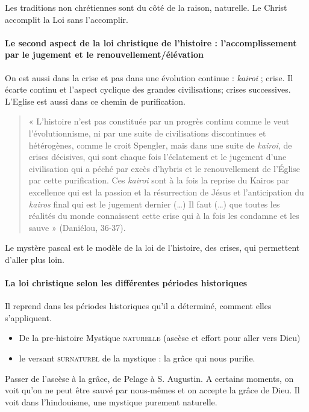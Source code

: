Les traditions non chrétiennes sont du côté de la raison, naturelle. 
Le Christ accomplit la Loi sans l'accomplir. 


\paragraph{Le second aspect de la loi christique de l’histoire : l’accomplissement par le jugement et le renouvellement/élévation}  On est aussi dans la crise et pas dans une évolution continue : \textit{kairoi} ; crise. Il écarte continu et l'aspect cyclique des grandes civilisations; crises successives. L'Eglise est aussi dans ce chemin de purification. 

\begin{quote}
    « L’histoire n’est pas constituée par un progrès continu comme le veut l’évolutionnisme, ni par une suite de civilisations discontinues et hétérogènes, comme le croit Spengler, mais dans une suite de \textit{kairoi}, de crises décisives, qui sont chaque fois l’éclatement et le jugement d’une civilisation qui a péché par excès d’hybris et le renouvellement de l’Église par cette purification. Ces \textit{kairoi} sont à la fois la reprise du Kairos par excellence qui est la passion et la résurrection de Jésus et l’anticipation du \textit{kairos} final qui est le jugement dernier (…) Il faut (…) que toutes les réalités du monde connaissent cette crise qui à la fois les condamne et les sauve » (Daniélou, 36-37). 
\end{quote}
Le mystère pascal est le modèle de la loi de l'histoire, des crises, qui permettent d'aller plus loin.




\paragraph{La loi christique selon les différentes périodes historiques }

Il reprend dans les périodes historiques qu'il a déterminé, comment elles s'appliquent.
\begin{itemize}
    \item {De la pre-histoire} Mystique \textsc{naturelle} (ascèse et effort pour aller vers Dieu)
    \item le versant \textsc{surnaturel} de la mystique : la grâce qui nous purifie. 
\end{itemize}
Passer de l'ascèse à la grâce, de Pelage à S. Augustin. A certains moments, on voit qu'on ne peut être sauvé par nous-mêmes et on accepte la grâce de Dieu. Il voit dans l'hindouisme, une mystique purement naturelle.

